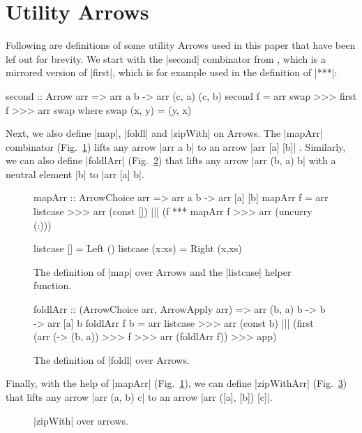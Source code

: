 \section{Utility Arrows}\label{utilfns}
Following are definitions of some utility Arrows used in this paper that have been lef out for brevity.
We start with the |second| combinator from \citet{HughesArrows}, which is a mirrored version of |first|, which is for example used in the definition of |***|: 
\begin{code}
second :: Arrow arr => arr a b -> arr (c, a) (c, b)
second f = arr swap >>> first f >>> arr swap
	where swap (x, y) = (y, x)
\end{code}

Next, we also define |map|, |foldl| and |zipWith| on Arrows.
The |mapArr| combinator (Fig.~\ref{fig:mapArr}) lifts any arrow |arr a
b| to an arrow |arr [a] [b]| \cite{programming_with_arrows}. 
Similarly, we can also define |foldlArr| (Fig.~\ref{fig:foldlArr}) that lifts any arrow |arr (b, a) b| with a neutral element |b| to |arr [a] b|.

\begin{figure}[h]
\begin{code}
mapArr :: ArrowChoice arr => arr a b -> arr [a] [b]
mapArr f =
	arr listcase >>>
	arr (const []) ||| (f *** mapArr f >>> arr (uncurry (:)))

listcase [] = Left ()
listcase (x:xs) = Right (x,xs)
\end{code}
\caption{The definition of |map| over Arrows and the |listcase| helper
function.}
\label{fig:mapArr}
\end{figure}

\begin{figure}[h]
\begin{code}
foldlArr :: (ArrowChoice arr, ArrowApply arr) => arr (b, a) b -> b -> arr [a] b
foldlArr f b =
	arr listcase >>>
	arr (const b) |||
		(first (arr (\a -> (b, a)) >>> f >>> arr (foldlArr f)) >>> app)
\end{code}
\caption{The definition of |foldl| over Arrows.}
\label{fig:foldlArr}
\end{figure}

Finally, with the help of |mapArr| (Fig.~\ref{fig:mapArr}), we can define |zipWithArr|  (Fig.~\ref{fig:zipWithArr}) that lifts any arrow |arr (a, b) c| to an arrow |arr ([a], [b]) [c]|.
\begin{figure}[h]
\caption{|zipWith| over arrows.}
\label{fig:zipWithArr}
\end{figure}

